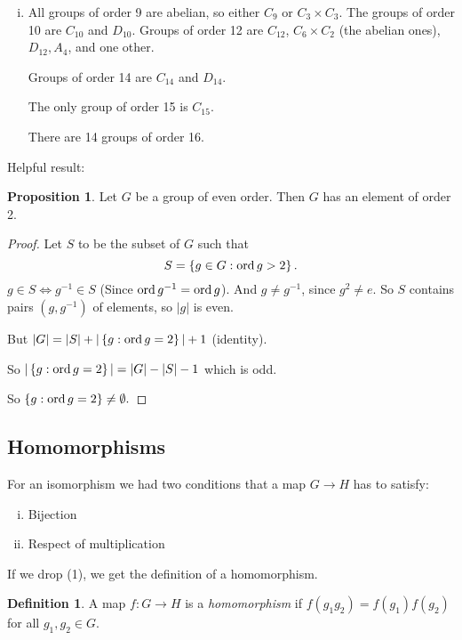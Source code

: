 \documentclass{article}
\theoremstyle{definition} \newtheorem*{definition}{Definition}
\newtheorem{proposition}[theorem]{Proposition}
\begin{document}
\begin{enumerate}[(i)]
\item All groups of order 9 are abelian, so either $C_9$ or $C_3 \times C_3$.
  The groups of order 10 are $C_{10}$ and $D_{10}$. Groups of order 12 are
  $C_{12}$, $ C_{6} \times C_2$ (the abelian ones), $D_{12},A_{4}$, and one
  other. 

  Groups of order 14 are $C_{14}$ and $D_{14}$. 

  The only group of order 15 is $C_{15}$.

  There are 14 groups of order 16.  \end{enumerate}

Helpful result: \begin{proposition} Let $G$ be a group of even order. Then $G$
  has an element of order 2.  \end{proposition}

\begin{proof} Let $S$ to be the subset of $G$ such that \begin{equation*} S =
    \left\{ g \in G : \operatorname{\text{ord}} g > 2 \right\}.  \end{equation*} $g \in S \iff
  g^{-1} \in S$ (Since $\operatorname{\text{ord}} g^{-1} = \operatorname{\text{ord}} g$). And $g \neq g^{-1}$, since $g^2
  \neq e$. So $S$ contains pairs $(g,g^{-1})$ of elements, so $|g|$ is even. 

  But $|G|=|S| + |\left\{ g : \operatorname{\text{ord}} g=2 \right\}| + 1$ (identity). 

  So $|\left\{ g : \operatorname{\text{ord}} g = 2 \right\}|=|G|-|S|-1$ which is odd. 

  So $\left\{ g : \operatorname{\text{ord}} g = 2 \right\} \neq \emptyset.$

\end{proof}


\subsection{Homomorphisms}

For an isomorphism we had two conditions that a map $G \rightarrow H$ has to
satisfy:

\begin{enumerate}[(i)] \item Bijection \item Respect of multiplication
  \end{enumerate}

If we drop (1), we get the definition of a homomorphism.\\

\begin{definition} A map $f:G \rightarrow H$ is a \emph{homomorphism} if $f(g_1
  g_2)=f(g_1)f(g_2)$ for all $g_1,g_2 \in G.$\\ \end{definition}
\end{document}
